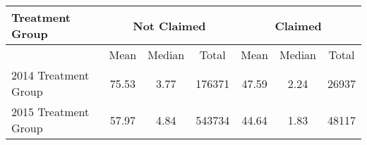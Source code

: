 \begin{tabular}{lcccccc} \toprule
Treatment Group & \multicolumn{3}{c}{Not Claimed} & \multicolumn{3}{c}{Claimed} \\ \midrule
 & Mean & Median & Total & Mean & Median & Total \\ \midrule 
2014 Treatment Group &       75.53&        3.77&      176371&       47.59&        2.24&       26937\\
2015 Treatment Group &       57.97&        4.84&      543734&       44.64&        1.83&       48117\\
 \bottomrule \end{tabular}
